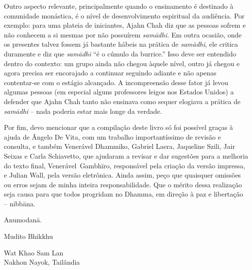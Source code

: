 Outro aspecto relevante, principalmente quando o ensinamento é
destinado à comunidade monástica, é o nível de desenvolvimento
espiritual da audiência. Por exemplo: para uma plateia de iniciantes,
Ajahn Chah diz que as pessoas sofrem e não conhecem a si mesmas por não
possuírem \emph{samādhi.} Em outra ocasião, onde os presentes
talvez fossem já bastante hábeis na prática de \emph{samādhi}, ele
critica duramente e diz que \emph{samādhi} “é o cúmulo da burrice.”
Isso deve ser entendido dentro do contexto: um grupo ainda não chegou
àquele nível, outro já chegou e agora precisa ser encorajado a
continuar seguindo adiante e não apenas contentar-se com o estágio
alcançado. A incompreensão desse fator já levou algumas pessoas (em
especial alguns professores leigos nos Estados Unidos) a defender que
Ajahn Chah tanto não ensinava como sequer elogiava a prática de
\emph{samādhi} – nada poderia estar mais longe da verdade.

Por fim, devo mencionar que a compilação deste livro só foi possível
graças à ajuda de Ângelo De Vita, com um trabalho importantíssimo de
revisão e consulta, e também Venerável Dhammiko, Gabriel \mbox{Laera},
Jaqueline Szili, Jair Seixas e Carla Schiavetto, que ajudaram a revisar
e dar sugestões para a melhoria do texto final, Venerável~Gambhīro,
responsável pela criação da versão impressa, e Julian Wall, pela versão
eletrônica. Ainda assim, peço que quaisquer omissões ou erros sejam de
minha inteira responsabilidade.  Que o mérito dessa realização seja
causa para que todos progridam no Dhamma, em direção à paz e libertação
– nibbāna.

Anumodanā.
\bigskip

{\raggedleft
Mudito Bhikkhu

Wat Khao Sam Lan\\
Nakhon Nayok, Tailândia
\par}

